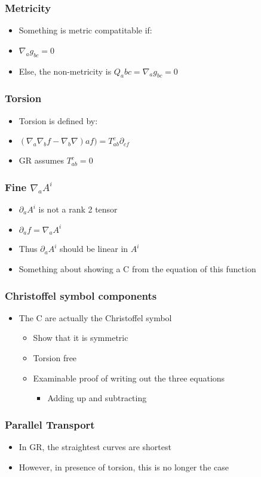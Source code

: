 \documentclass[11pt]{article}
\begin{document}
\subsubsection{Metricity}
\label{sec:org814dd78}
\begin{itemize}
\item Something is metric compatitable if:
\item \(\nabla_a g_{bc} = 0\)
\item Else, the non-metricity is \(Q_abc =  \nabla_a g_{bc} = 0\)
\end{itemize}
\subsubsection{Torsion}
\label{sec:org9355679}
\begin{itemize}
\item Torsion is defined by:
\item \((\nabla_a\nabla_b f - \nabla_b \nabla)a f) = T_{ab}^c\partial_{cf}\)
\item GR assumes \(T_{ab}^c=0\)
\end{itemize}
\subsubsection{Fine \(\nabla_a A^i\)}
\label{sec:org831b1eb}
\begin{itemize}
\item \(\partial_a A^i\) is not a rank 2 tensor
\item \(\partial_a f = \nabla_a A^i\)
\item Thus \(\partial_a A^i\) should be linear in \(A^i\)
\item Something about showing a C from the equation of this function
\end{itemize}
\subsubsection{Christoffel symbol components}
\label{sec:org4310a85}
\begin{itemize}
\item The C are actually the Christoffel symbol
\begin{itemize}
\item Show that it is symmetric
\item Torsion free
\item Examinable proof of writing out the three equations
\begin{itemize}
\item Adding up and subtracting
\end{itemize}
\end{itemize}
\end{itemize}
\subsubsection{Parallel Transport}
\label{sec:orga16b15f}
\begin{itemize}
\item In GR, the straightest curves are shortest
\item However, in presence of torsion, this is no longer the case
\end{itemize}
\end{document}
